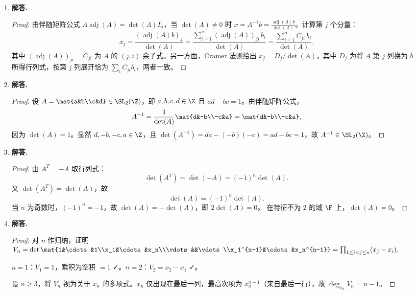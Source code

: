 \begin{enumerate}[label=\textbf{\arabic*.}, leftmargin=*, itemsep=1em]
  \item \textbf{解答.}
  \begin{proof}
  由伴随矩阵公式 $A\operatorname{adj}(A)=\det(A)I_n$，当 $\det(A)\ne0$ 时 $x=A^{-1}b=\frac{\operatorname{adj}(A)b}{\det(A)}$。计算第 $j$ 个分量：
  \[
    x_j = \frac{(\operatorname{adj}(A)b)_j}{\det(A)}
        = \frac{\sum_{i=1}^n(\operatorname{adj}(A))_{ji}\,b_i}{\det(A)}
        = \frac{\sum_{i=1}^n C_{ji}\,b_i}{\det(A)}.
  \]
  其中 $(\operatorname{adj}(A))_{ji}=C_{ji}$ 为 $A$ 的 $(j,i)$ 余子式。另一方面，Cramer 法则给出 $x_j=D_j/\det(A)$，其中 $D_j$ 为将 $A$ 第 $j$ 列换为 $b$ 所得行列式，按第 $j$ 列展开恰为 $\sum_i C_{ji}b_i$，两者一致。
  \end{proof}

  \item \textbf{解答.}
  \begin{proof}
  设 $A=\mat{a&b\\c&d}\in\SL_2(\Z)$，即 $a,b,c,d\in\Z$ 且 $ad-bc=1$。由伴随矩阵公式，
  \[
    A^{-1} = \frac{1}{\det(A)}\mat{d&-b\\-c&a} = \mat{d&-b\\-c&a},
  \]
  因为 $\det(A)=1$。显然 $d,-b,-c,a\in\Z$，且 $\det(A^{-1})=da-(-b)(-c)=ad-bc=1$，故 $A^{-1}\in\SL_2(\Z)$。
  \end{proof}

  \item \textbf{解答.}
  \begin{proof}
  由 $A^T=-A$ 取行列式：
  \[
    \det(A^T) = \det(-A) = (-1)^n\det(A).
  \]
  又 $\det(A^T)=\det(A)$，故
  \[
    \det(A) = (-1)^n\det(A).
  \]
  当 $n$ 为奇数时，$(-1)^n=-1$，故 $\det(A)=-\det(A)$，即 $2\det(A)=0$。
  在特征不为 $2$ 的域 $\F$ 上，$\det(A)=0$。
  \end{proof}


  \item \textbf{解答.}
  \begin{proof}
  对 $n$ 作归纳，证明
  $V_n = \det\mat{1&\cdots&1\\x_1&\cdots&x_n\\\vdots&&\vdots\\x_1^{n-1}&\cdots&x_n^{n-1}}
       = \prod_{1\le i<j\le n}(x_j-x_i).$

  $n=1$：$V_1=1$，乘积为空积 $=1$ ✓。$n=2$：$V_2=x_2-x_1$ ✓。

  设 $n\ge3$，将 $V_n$ 视为关于 $x_n$ 的多项式。$x_n$ 仅出现在最后一列，最高次项为 $x_n^{n-1}$（来自最后一行），故 $\deg_{x_n}V_n=n-1$。


\end{proof}
\end{enumerate}

